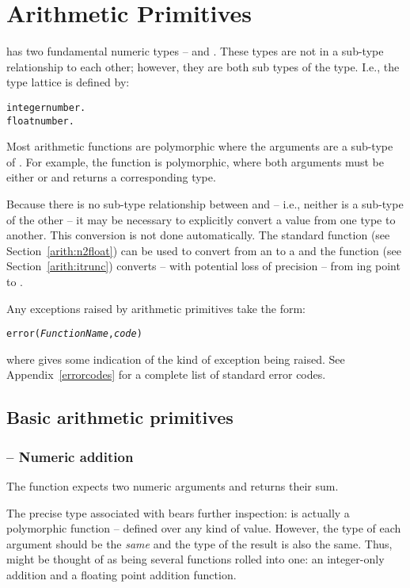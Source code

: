 \chapter{Arithmetic Primitives}

\go has two fundamental numeric types --  and . These types are not in a sub-type relationship to each other; however, they are both sub types of the  type. I.e., the type lattice is defined by:
\begin{alltt}
integer\impl{}number.
float\impl{}number.
\end{alltt}
Most arithmetic functions are polymorphic where the arguments are a sub-type of . For example, the \q{+} function is polymorphic, where both arguments must be either  or  and returns a corresponding type.

Because there is no sub-type relationship between  and  -- i.e., neither is a sub-type of the other -- it may be necessary to explicitly convert a value from one type to another. This conversion is not done automatically. The standard  function (see Section~\vref{arith:n2float}) can be used to convert from an  to a  and the  function (see Section~\vref{arith:itrunc}) converts -- with potential loss of precision -- from ing point to .


Any exceptions raised by arithmetic primitives take the form:
\begin{alltt}
error(\emph{FunctionName},\emph{code})
\end{alltt}
where  gives some indication of the kind of exception being raised. See Appendix~\vref{errorcodes} for a complete list of standard error codes.

\section{Basic arithmetic primitives}
\label{arith:basic}

\subsection{\function{+} -- Numeric addition}
The \function{+} function expects two numeric arguments and returns their sum. 

The precise type associated with \q{+} bears further inspection: \q{+} is actually a polymorphic function -- defined over any kind of  value. However, the type of each argument should be the \emph{same} and the type of the result is also the same. Thus, \q{+} might be thought of as being several functions rolled into one: an integer-only addition and a floating point addition function.

